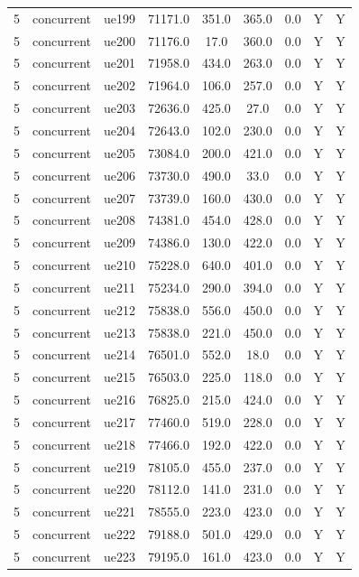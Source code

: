 \begin{table}[ht]
\begin{tabular}{|c|c|c|c|c|c|c|c|c|}
5 & concurrent & ue199 & 71171.0 & 351.0 & 365.0 & 0.0 & Y & Y \\
5 & concurrent & ue200 & 71176.0 & 17.0 & 360.0 & 0.0 & Y & Y \\
5 & concurrent & ue201 & 71958.0 & 434.0 & 263.0 & 0.0 & Y & Y \\
5 & concurrent & ue202 & 71964.0 & 106.0 & 257.0 & 0.0 & Y & Y \\
5 & concurrent & ue203 & 72636.0 & 425.0 & 27.0 & 0.0 & Y & Y \\
5 & concurrent & ue204 & 72643.0 & 102.0 & 230.0 & 0.0 & Y & Y \\
5 & concurrent & ue205 & 73084.0 & 200.0 & 421.0 & 0.0 & Y & Y \\
5 & concurrent & ue206 & 73730.0 & 490.0 & 33.0 & 0.0 & Y & Y \\
5 & concurrent & ue207 & 73739.0 & 160.0 & 430.0 & 0.0 & Y & Y \\
5 & concurrent & ue208 & 74381.0 & 454.0 & 428.0 & 0.0 & Y & Y \\
5 & concurrent & ue209 & 74386.0 & 130.0 & 422.0 & 0.0 & Y & Y \\
5 & concurrent & ue210 & 75228.0 & 640.0 & 401.0 & 0.0 & Y & Y \\
5 & concurrent & ue211 & 75234.0 & 290.0 & 394.0 & 0.0 & Y & Y \\
5 & concurrent & ue212 & 75838.0 & 556.0 & 450.0 & 0.0 & Y & Y \\
5 & concurrent & ue213 & 75838.0 & 221.0 & 450.0 & 0.0 & Y & Y \\
5 & concurrent & ue214 & 76501.0 & 552.0 & 18.0 & 0.0 & Y & Y \\
5 & concurrent & ue215 & 76503.0 & 225.0 & 118.0 & 0.0 & Y & Y \\
5 & concurrent & ue216 & 76825.0 & 215.0 & 424.0 & 0.0 & Y & Y \\
5 & concurrent & ue217 & 77460.0 & 519.0 & 228.0 & 0.0 & Y & Y \\
5 & concurrent & ue218 & 77466.0 & 192.0 & 422.0 & 0.0 & Y & Y \\
5 & concurrent & ue219 & 78105.0 & 455.0 & 237.0 & 0.0 & Y & Y \\
5 & concurrent & ue220 & 78112.0 & 141.0 & 231.0 & 0.0 & Y & Y \\
5 & concurrent & ue221 & 78555.0 & 223.0 & 423.0 & 0.0 & Y & Y \\
5 & concurrent & ue222 & 79188.0 & 501.0 & 429.0 & 0.0 & Y & Y \\
5 & concurrent & ue223 & 79195.0 & 161.0 & 423.0 & 0.0 & Y & Y \\

\end{tabular}
\end{table}
